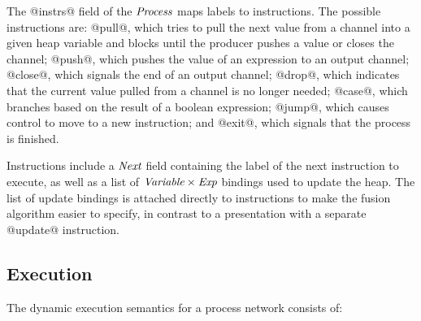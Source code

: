 The @instrs@ field of the $\textit{Process}$ maps labels to instructions.
The possible instructions are: @pull@, which tries to pull the next value from a channel into a given heap variable and blocks until the producer pushes a value or closes the channel; @push@, which pushes the value of an expression to an output channel; @close@, which signals the end of an output channel; @drop@, which indicates that the current value pulled from a channel is no longer needed; @case@, which branches based on the result of a boolean expression; @jump@, which causes control to move to a new instruction; and @exit@, which signals that the process is finished.

Instructions include a $\textit{Next}$ field containing the label of the next instruction to execute, as well as a list of $\textit{Variable} \times \textit{Exp}$ bindings used to update the heap.
The list of update bindings is attached directly to instructions to make the fusion algorithm easier to specify, in contrast to a presentation with a separate @update@ instruction.





\subsection{Execution}
\label{s:Process:Eval}

The dynamic execution semantics for a process network consists of:

